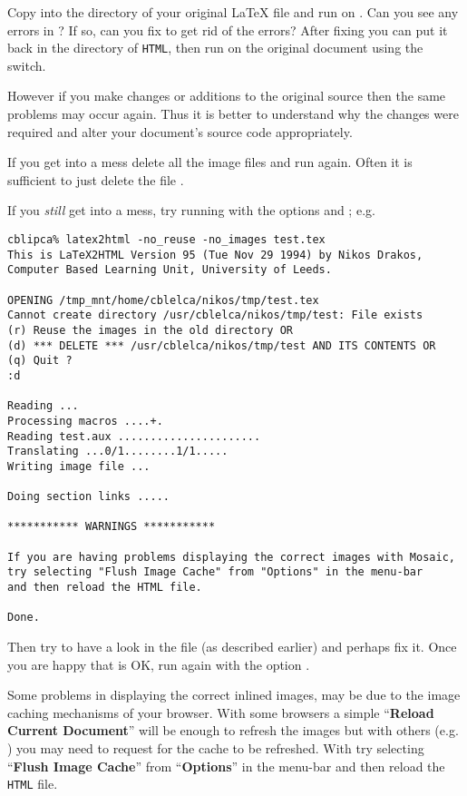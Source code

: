 \begin{htmllist}
Copy  into the directory 
of your original \LaTeX{} file and run  on .
Can you see any errors in ?
If so, can you fix  to get rid of the errors? 
After fixing 
you can put it back in the directory of \texttt{HTML},
then run \latextohtml{} on the original document 
using the  switch. 

However if you make changes or additions to the original source
then the same problems may occur again. 
Thus it is better to understand why the changes were required 
and alter your document's source code appropriately.

\medskip

If you get into a mess delete all the image files and run \latextohtml{}
again. Often it is sufficient to just delete the file .

If you \emph{still} get into a mess, try running \latextohtml{} with the options
 and ; e.g.
\begin{small}
\begin{verbatim}
cblipca% latex2html -no_reuse -no_images test.tex
This is LaTeX2HTML Version 95 (Tue Nov 29 1994) by Nikos Drakos, 
Computer Based Learning Unit, University of Leeds.

OPENING /tmp_mnt/home/cblelca/nikos/tmp/test.tex 
Cannot create directory /usr/cblelca/nikos/tmp/test: File exists
(r) Reuse the images in the old directory OR
(d) *** DELETE *** /usr/cblelca/nikos/tmp/test AND ITS CONTENTS OR
(q) Quit ?
:d

Reading ...
Processing macros ....+.
Reading test.aux ......................
Translating ...0/1........1/1.....
Writing image file ...

Doing section links .....

*********** WARNINGS ***********

If you are having problems displaying the correct images with Mosaic,
try selecting "Flush Image Cache" from "Options" in the menu-bar 
and then reload the HTML file.

Done.
\end{verbatim}
\end{small}
Then try to have a look in the file   
(as described earlier) and perhaps fix it.
Once you are happy that  is OK, run \latextohtml{}
again with the option .

Some problems in displaying the correct inlined images,
may be due to the image caching mechanisms of your browser.
With some browsers a simple ``\textbf{Reload Current Document}'' will be enough
to refresh the images but with others (e.g. ) you may need
to request for the cache to be refreshed. With  try 
selecting ``\textbf{Flush Image Cache}'' from ``\textbf{Options}'' in the menu-bar 
and then reload the \texttt{HTML} file.



\end{htmllist}
